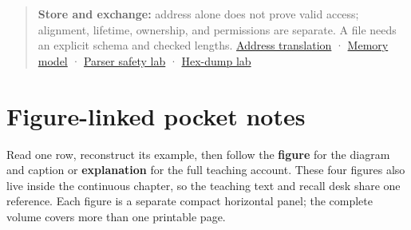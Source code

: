 \begin{quote}
\textbf{Store and exchange:} address alone does not prove valid access; alignment, lifetime, ownership, and permissions are separate. A file needs an explicit schema and checked lengths. \href{Continuous\%20Notes/Computing\%20Foundations\%20-\%20From\%20Bits\%20to\%20C++\%20and\%20Systems\%20APIs\#Virtual\%20memory\%20translates\%20page\%20identity}{Address translation} · \href{Continuous\%20Notes/Computing\%20Foundations\%20-\%20From\%20Bits\%20to\%20C++\%20and\%20Systems\%20APIs\#Storage,\%20lifetime,\%20ownership,\%20and\%20placement\%20are\%20different\%20axes}{Memory model} · \href{Continuous\%20Notes/Computing\%20Foundations\%20-\%20From\%20Bits\%20to\%20C++\%20and\%20Systems\%20APIs\#Validate\%20lengths\%20before\%20performing\%20the\%20arithmetic\%20they\%20request}{Parser safety lab} · \href{Continuous\%20Notes/Computing\%20Foundations\%20-\%20From\%20Bits\%20to\%20C++\%20and\%20Systems\%20APIs\#Read\%20a\%20dump\%20by\%20reversing\%20the\%20contract}{Hex-dump lab}
\end{quote}

\section{Figure-linked pocket notes}\label{appendix-ef4d27797a92-figure-linked-pocket-notes}

Read one row, reconstruct its example, then follow the \textbf{figure} for the diagram and caption or \textbf{explanation} for the full teaching account. These four figures also live inside the continuous chapter, so the teaching text and recall desk share one reference. Each figure is a separate compact horizontal panel; the complete volume covers more than one printable page.

